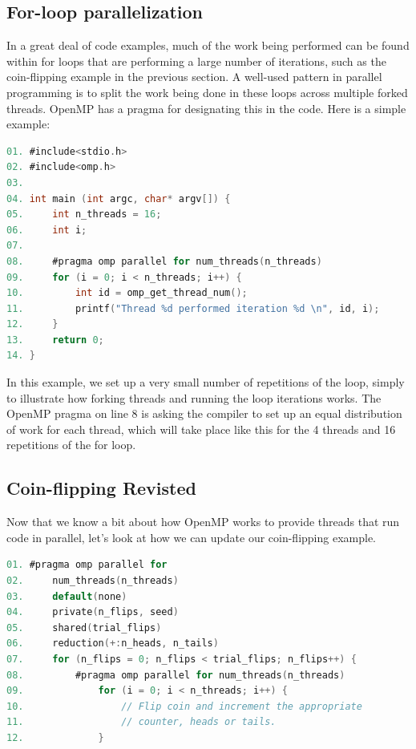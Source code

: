 \documentclass[a4paper, 11pt]{article}
\begin{document}
\pagebreak

\subsection{For-loop parallelization}

In a great deal of code examples, much of the work being performed can be found within for loops that are performing a large number of iterations, such as the coin-flipping example in the previous section. A well-used pattern in parallel programming is to split the work being done in these loops across multiple forked threads. OpenMP has a pragma for designating this in the code. Here is a simple example:

\begin{lstlisting}[language=C]
01. #include<stdio.h>
02. #include<omp.h>
03. 
04. int main (int argc, char* argv[]) {
05.     int n_threads = 16;
06.     int i;
07.
08.     #pragma omp parallel for num_threads(n_threads)
09.     for (i = 0; i < n_threads; i++) { 
10.         int id = omp_get_thread_num();
11.         printf("Thread %d performed iteration %d \n", id, i);
12.     }
13.     return 0;
14. }
\end{lstlisting}

In this example, we set up a very small number of repetitions of the loop, simply to illustrate how forking threads and running the loop iterations works. The OpenMP pragma on line 8 is asking the compiler to set up an equal distribution of work for each thread, which will take place like this for the 4 threads and 16 repetitions of the for loop.

\pagebreak
\subsection{Coin-flipping Revisted}

Now that we know a bit about how OpenMP works to provide threads that run code in parallel, let's look at how we can update our coin-flipping example.

\begin{lstlisting}[language=C]
01. #pragma omp parallel for
02.     num_threads(n_threads)
03.     default(none)
04.     private(n_flips, seed)
05.     shared(trial_flips)
06.     reduction(+:n_heads, n_tails)
07.     for (n_flips = 0; n_flips < trial_flips; n_flips++) {
08.         #pragma omp parallel for num_threads(n_threads)
09.             for (i = 0; i < n_threads; i++) { 
10.                 // Flip coin and increment the appropriate
11.                 // counter, heads or tails.
12.             }
\end{lstlisting}
\end{document}
